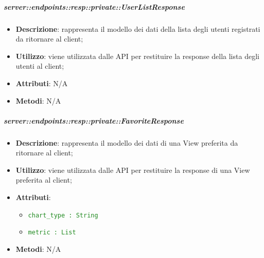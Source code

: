     \subparagraph{server::endpoints::resp::private::UserListResponse} %
    \label{subp:bdsm_app_server_endpoints_resp_private_userlistresponse}
    \begin{itemize}
      \item \textbf{Descrizione}: rappresenta il modello dei dati della lista degli utenti registrati da ritornare al client;
      \item \textbf{Utilizzo}: viene utilizzata dalle API per restituire la response della lista degli utenti al client;
    \item \textbf{Attributi}: N/A
    \item \textbf{Metodi}: N/A
    \end{itemize}

    \subparagraph{server::endpoints::resp::private::FavoriteResponse} %
    \label{subp:bdsm_app_server_endpoints_resp_private_favoriteresponse}
    \begin{itemize}
      \item \textbf{Descrizione}: rappresenta il modello dei dati di una View preferita da ritornare al client;
      \item \textbf{Utilizzo}: viene utilizzata dalle API per restituire la response di una View preferita al client;
    \item \textbf{Attributi}:
      \begin{itemize}
        \item \textcolor{forestgreen}{\texttt{chart\_type : String}}
        \item \textcolor{forestgreen}{\texttt{metric : List}}
      \end{itemize}
    \item \textbf{Metodi}: N/A
    \end{itemize}

